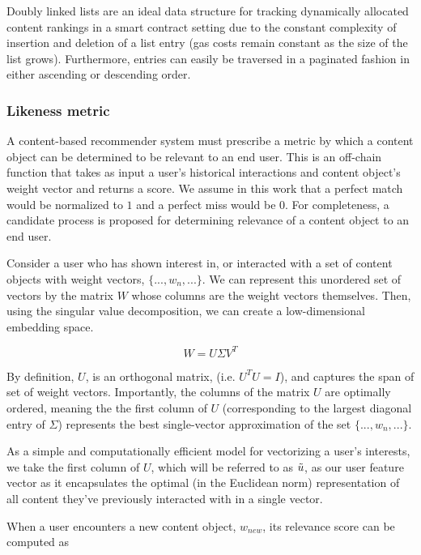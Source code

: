Doubly linked lists are an ideal data structure for tracking dynamically allocated content rankings in a smart contract setting due to the constant complexity of insertion and deletion of a list entry (gas costs remain constant as the size of the list grows). Furthermore, entries can easily be traversed in a paginated fashion in either ascending or descending order. 

\subsubsection{Likeness metric}
\label{LikenessMetricDefinition}

A content-based recommender system must prescribe a metric by which a content object can be determined to be relevant to an end user. This is an off-chain function that takes as input a user's historical interactions and content object's weight vector and returns a score. We assume in this work that a perfect match would be normalized to $1$ and a perfect miss would be $0$. For completeness, a candidate process is proposed for determining relevance of a content object to an end user.

Consider a user who has shown interest in, or interacted with a set of content objects with weight vectors, $\{..., w_n,...\}$. We can represent this unordered set of vectors by the matrix $W$ whose columns are the weight vectors themselves. Then, using the singular value decomposition, we can create a low-dimensional embedding space.  

\begin{equation}
    W = U \Sigma V^T
\end{equation}

By definition, $U$, is an orthogonal matrix, (i.e. $U^TU = I$), and captures the span of set of weight vectors. Importantly, the columns of the matrix $U$ are optimally ordered, meaning the the first column of $U$ (corresponding to the largest diagonal entry of $\Sigma$) represents the best single-vector approximation of the set $\{..., w_n,...\}$. 

As a simple and computationally efficient model for vectorizing a user's interests, we take the first column of $U$, which will be referred to as $\Tilde{u}$, as our user feature vector as it encapsulates the optimal (in the Euclidean norm) representation of all content they've previously interacted with in a single vector.

When a user encounters a new content object, $w_{new}$, its relevance score can be computed as

